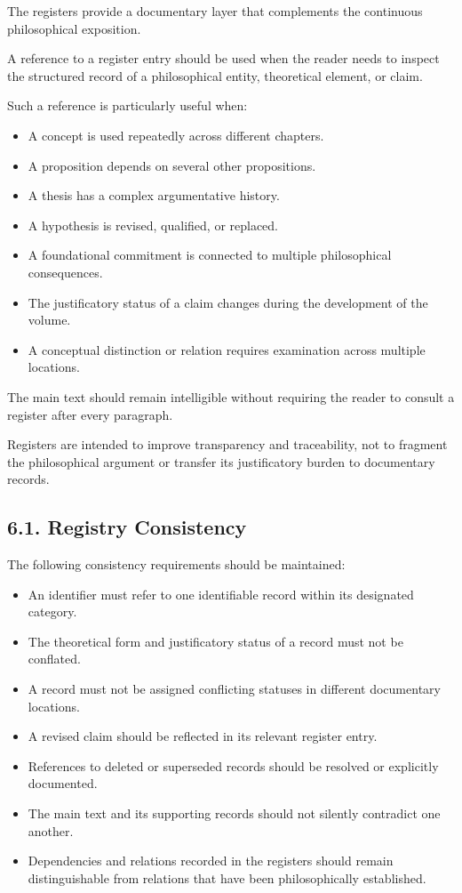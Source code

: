 The registers provide a documentary layer that
complements the continuous philosophical exposition.

A reference to a register entry should be used
when the reader needs to inspect the structured
record of a philosophical entity, theoretical
element, or claim.

Such a reference is particularly useful when:

\begin{itemize}
    \item A concept is used repeatedly across
    different chapters.
    \item A proposition depends on several
    other propositions.
    \item A thesis has a complex argumentative history.
    \item A hypothesis is revised, qualified,
    or replaced.
    \item A foundational commitment is connected
    to multiple philosophical consequences.
    \item The justificatory status of a claim
    changes during the development of the volume.
    \item A conceptual distinction or relation
    requires examination across multiple locations.
\end{itemize}

The main text should remain intelligible without
requiring the reader to consult a register after
every paragraph.

Registers are intended to improve transparency
and traceability, not to fragment the philosophical
argument or transfer its justificatory burden
to documentary records.

\subsection*{6.1. Registry Consistency}

The following consistency requirements should
be maintained:

\begin{itemize}
    \item An identifier must refer to one identifiable
    record within its designated category.
    \item The theoretical form and justificatory
    status of a record must not be conflated.
    \item A record must not be assigned conflicting
    statuses in different documentary locations.
    \item A revised claim should be reflected
    in its relevant register entry.
    \item References to deleted or superseded
    records should be resolved or explicitly
    documented.
    \item The main text and its supporting records
    should not silently contradict one another.
    \item Dependencies and relations recorded
    in the registers should remain distinguishable
    from relations that have been philosophically
    established.
\end{itemize}

